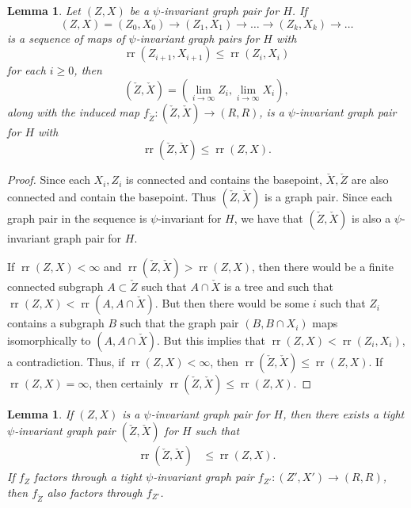 \documentclass[11pt, a4paper]{amsart}
\newtheorem{lemma}[theorem]{Lemma}
\theoremstyle{definition}
\DeclareMathOperator{\rr}{rr}
\begin{document}
\begin{lemma}
\label{lem:direct_limit_pair}
Let $(Z, X)$ be a $\psi$-invariant graph pair for $H$. If
\[
(Z, X) = (Z_0, X_0) \to (Z_1, X_1) \to\ldots \to (Z_k, X_k)\to \ldots
\]
is a sequence of maps of $\psi$-invariant graph pairs for $H$ with
\[
\rr(Z_{i+1}, X_{i+1}) \leqslant \rr(Z_i, X_i)
\]
for each $i\geqslant 0$, then
\[
(\check{Z}, \check{X}) = \left(\lim_{i\to \infty}Z_i, \lim_{i\to \infty}X_i\right),
\]
along with the induced map $f_{\check{Z}}\colon(\check{Z}, \check{X})\to (R, R)$, is a $\psi$-invariant graph pair for $H$ with
\[
\rr(\check{Z}, \check{X}) \leqslant \rr(Z, X).
\]
\end{lemma}

\begin{proof}
Since each $X_i, Z_i$ is connected and contains the basepoint, $\check{X}, \check{Z}$ are also connected and contain the basepoint. Thus $(\check{Z}, \check{X})$ is a graph pair. Since each graph pair in the sequence is $\psi$-invariant for $H$, we have that $(\check{Z}, \check{X})$ is also a $\psi$-invariant graph pair for $H$. 

If $\rr(Z, X)<\infty$ and $\rr(\check{Z}, \check{X})> \rr(Z, X)$, then there would be a finite connected subgraph $A\subset \check{Z}$ such that $A\cap \check{X}$ is a tree and such that $\rr(Z, X)<\rr(A, A\cap \check{X})$. But then there would be some $i$ such that $Z_i$ contains a subgraph $B$ such that the graph pair $(B, B\cap X_i)$ maps isomorphically to $(A, A\cap \check{X})$. But this implies that $\rr(Z, X)<\rr(Z_i, X_i)$, a contradiction. Thus, if $\rr(Z, X)<\infty$, then $\rr(\check{Z}, \check{X})\leqslant \rr(Z, X)$. If $\rr(Z, X) = \infty$, then certainly $\rr(\check{Z}, \check{X})\leqslant \rr(Z, X)$.
\end{proof}


\begin{lemma}
\label{lem:tight}
If $(Z, X)$ is a $\psi$-invariant graph pair for $H$, then there exists a tight $\psi$-invariant graph pair $(\check{Z}, \check{X})$ for $H$ such that 
\begin{align*}
\rr(\check{Z}, \check{X}) &\leqslant \rr(Z, X).
\end{align*}
If $f_Z$ factors through a tight $\psi$-invariant graph pair $f_{Z'}\colon (Z', X')\to (R, R)$, then $f_{\check{Z}}$ also factors through $f_{Z'}$.
\end{lemma}
\end{document}

